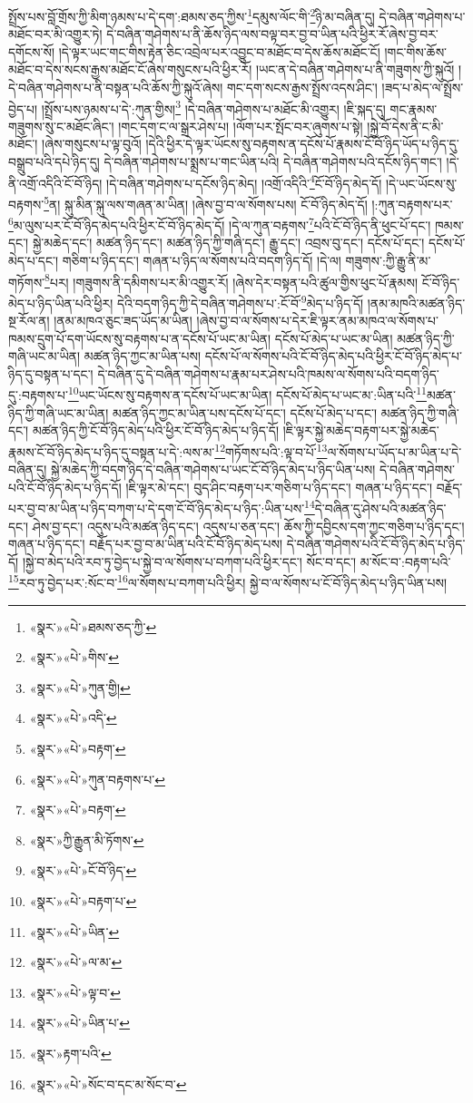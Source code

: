 སྤྲོས་པས་བློ་གྲོས་ཀྱི་མིག་ཉམས་པ་དེ་དག་:ཐམས་ཅད་ཀྱིས་\footnote{«སྣར་»«པེ་»ཐམས་ཅད་ཀྱི་}དམུས་ལོང་གི་\footnote{«སྣར་»«པེ་»གིས་}ཉི་མ་བཞིན་དུ། དེ་བཞིན་གཤེགས་པ་མཐོང་བར་མི་འགྱུར་ཏེ། དེ་བཞིན་གཤེགས་པ་ནི་ཆོས་ཉིད་ལས་བལྟ་བར་བྱ་བ་ཡིན་པའི་ཕྱིར་རོ་ཞེས་བྱ་བར་དགོངས་སོ། །དེ་ལྟར་ཡང་གང་གིས་རྟེན་ཅིང་འབྲེལ་པར་འབྱུང་བ་མཐོང་བ་དེས་ཆོས་མཐོང་ངོ། །གང་གིས་ཆོས་མཐོང་བ་དེས་སངས་རྒྱས་མཐོང་ངོ་ཞེས་གསུངས་པའི་ཕྱིར་རོ། །ཡང་ན་དེ་བཞིན་གཤེགས་པ་ནི་གཟུགས་ཀྱི་སྐུའོ། །དེ་བཞིན་གཤེགས་པ་ནི་བསྟན་པའི་ཆོས་ཀྱི་སྐུའོ་ཞེས། གང་དག་སངས་རྒྱས་སྤྲོས་འདས་ཤིང་། །ཟད་པ་མེད་ལ་སྤྲོས་བྱེད་པ། །སྤྲོས་པས་ཉམས་པ་དེ་:ཀུན་གྱིས།\footnote{«སྣར་»«པེ་»ཀུན་གྱི།} །དེ་བཞིན་གཤེགས་པ་མཐོང་མི་འགྱུར། །ཇི་སྐད་དུ། གང་རྣམས་གཟུགས་སུ་ང་མཐོང་ཞིང་། །གང་དག་ང་ལ་སྒྲར་ཤེས་པ། །ལོག་པར་སྤོང་བར་ཞུགས་པ་སྟེ། །སྐྱེ་བོ་དེས་ནི་ང་མི་མཐོང་། །ཞེས་གསུངས་པ་ལྟ་བུའོ། །དེའི་ཕྱིར་དེ་ལྟར་ཡོངས་སུ་བརྟགས་ན་དངོས་པོ་རྣམས་ངོ་བོ་ཉིད་ཡོད་པ་ཉིད་དུ་བསྒྲུབ་པའི་དཔེ་ཉིད་དུ། དེ་བཞིན་གཤེགས་པ་སྨྲས་པ་གང་ཡིན་པའི། དེ་བཞིན་གཤེགས་པའི་དངོས་ཉིད་གང་། །དེ་ནི་འགྲོ་འདིའི་ངོ་བོ་ཉིད། །དེ་བཞིན་གཤེགས་པ་དངོས་ཉིད་མེད། །འགྲོ་འདིའི་\footnote{«སྣར་»«པེ་»འདི་}ངོ་བོ་ཉིད་མེད་དོ། །དེ་ཡང་ཡོངས་སུ་བརྟགས་\footnote{«སྣར་»«པེ་»བརྟག་}ན། སྐུ་མིན་སྐུ་ལས་གཞན་མ་ཡིན། །ཞེས་བྱ་བ་ལ་སོགས་པས། ངོ་བོ་ཉིད་མེད་དོ། །:ཀུན་བརྟགས་པར་\footnote{«སྣར་»«པེ་»ཀུན་བརྟགས་པ་}མ་ལུས་པར་ངོ་བོ་ཉིད་མེད་པའི་ཕྱིར་ངོ་བོ་ཉིད་མེད་དོ། །དེ་ལ་ཀུན་བརྟགས་\footnote{«སྣར་»«པེ་»བརྟག་}པའི་ངོ་བོ་ཉིད་ནི་ཕུང་པོ་དང་། ཁམས་དང་། སྐྱེ་མཆེད་དང་། མཚན་ཉིད་དང་། མཚན་ཉིད་ཀྱི་གཞི་དང་། རྒྱུ་དང་། འབྲས་བུ་དང་། དངོས་པོ་དང་། དངོས་པོ་མེད་པ་དང་། གཅིག་པ་ཉིད་དང་། གཞན་པ་ཉིད་ལ་སོགས་པའི་བདག་ཉིད་དོ། །དེ་ལ། གཟུགས་:ཀྱི་རྒྱུ་ནི་མ་གཏོགས་\footnote{«སྣར་»ཀྱི་རྒྱུན་མི་ཏོགས་}པར། །གཟུགས་ནི་དམིགས་པར་མི་འགྱུར་རོ། །ཞེས་དེར་བསྟན་པའི་ཚུལ་གྱིས་ཕུང་པོ་རྣམས། ངོ་བོ་ཉིད་མེད་པ་ཉིད་ཡིན་པའི་ཕྱིར། དེའི་བདག་ཉིད་ཀྱི་དེ་བཞིན་གཤེགས་པ་:ངོ་བོ་\footnote{«སྣར་»«པེ་»ངོ་བོ་ཉིད་}མེད་པ་ཉིད་དོ། །ནམ་མཁའི་མཚན་ཉིད་སྔ་རོལ་ན། །ནམ་མཁའ་ཅུང་ཟད་ཡོད་མ་ཡིན། །ཞེས་བྱ་བ་ལ་སོགས་པ་དེར་ཇི་ལྟར་ནམ་མཁའ་ལ་སོགས་པ་ཁམས་དྲུག་པོ་དག་ཡོངས་སུ་བརྟགས་པ་ན་དངོས་པོ་ཡང་མ་ཡིན། དངོས་པོ་མེད་པ་ཡང་མ་ཡིན། མཚན་ཉིད་ཀྱི་གཞི་ཡང་མ་ཡིན། མཚན་ཉིད་ཀྱང་མ་ཡིན་པས། དངོས་པོ་ལ་སོགས་པའི་ངོ་བོ་ཉིད་མེད་པའི་ཕྱིར་ངོ་བོ་ཉིད་མེད་པ་ཉིད་དུ་བསྟན་པ་དང་། དེ་བཞིན་དུ་དེ་བཞིན་གཤེགས་པ་རྣམ་པར་ཤེས་པའི་ཁམས་ལ་སོགས་པའི་བདག་ཉིད་དུ་:བརྟགས་པ་\footnote{«སྣར་»«པེ་»བརྟག་པ་}ཡང་ཡོངས་སུ་བརྟགས་ན་དངོས་པོ་ཡང་མ་ཡིན། དངོས་པོ་མེད་པ་ཡང་མ་:ཡིན་པའི་\footnote{«སྣར་»«པེ་»ཡིན་}མཚན་ཉིད་ཀྱི་གཞི་ཡང་མ་ཡིན། མཚན་ཉིད་ཀྱང་མ་ཡིན་པས་དངོས་པོ་དང་། དངོས་པོ་མེད་པ་དང་། མཚན་ཉིད་ཀྱི་གཞི་དང་། མཚན་ཉིད་ཀྱི་ངོ་བོ་ཉིད་མེད་པའི་ཕྱིར་ངོ་བོ་ཉིད་མེད་པ་ཉིད་དོ། །ཇི་ལྟར་སྐྱེ་མཆེད་བརྟག་པར་སྐྱེ་མཆེད་རྣམས་ངོ་བོ་ཉིད་མེད་པ་ཉིད་དུ་བསྟན་པ་དེ་:ལས་མ་\footnote{«སྣར་»«པེ་»ལ་མ་}གཏོགས་པའི་:ལྟ་བ་པོ་\footnote{«སྣར་»«པེ་»ལྟ་བ་}ལ་སོགས་པ་ཡོད་པ་མ་ཡིན་པ་དེ་བཞིན་དུ། སྐྱེ་མཆེད་ཀྱི་བདག་ཉིད་དེ་བཞིན་གཤེགས་པ་ཡང་ངོ་བོ་ཉིད་མེད་པ་ཉིད་ཡིན་པས། དེ་བཞིན་གཤེགས་པའི་ངོ་བོ་ཉིད་མེད་པ་ཉིད་དོ། །ཇི་ལྟར་མེ་དང་། བུད་ཤིང་བརྟག་པར་གཅིག་པ་ཉིད་དང་། གཞན་པ་ཉིད་དང་། བརྗོད་པར་བྱ་བ་མ་ཡིན་པ་ཉིད་བཀག་པ་དེ་དག་ངོ་བོ་ཉིད་མེད་པ་ཉིད་:ཡིན་པས་\footnote{«སྣར་»«པེ་»ཡིན་པ་}དེ་བཞིན་དུ་ཤེས་པའི་མཚན་ཉིད་དང་། ཤེས་བྱ་དང་། འདུས་པའི་མཚན་ཉིད་དང་། འདུས་པ་ཅན་དང་། ཆོས་ཀྱི་དབྱིངས་དག་ཀྱང་གཅིག་པ་ཉིད་དང་། གཞན་པ་ཉིད་དང་། བརྗོད་པར་བྱ་བ་མ་ཡིན་པའི་ངོ་བོ་ཉིད་མེད་པས། དེ་བཞིན་གཤེགས་པའི་ངོ་བོ་ཉིད་མེད་པ་ཉིད་དོ། །སྐྱེ་བ་མེད་པའི་རབ་ཏུ་བྱེད་པ་སྐྱེ་བ་ལ་སོགས་པ་བཀག་པའི་ཕྱིར་དང་། སོང་བ་དང་། མ་སོང་བ་:བརྟག་པའི་\footnote{«སྣར་»རྟག་པའི་}རབ་ཏུ་བྱེད་པར་:སོང་བ་\footnote{«སྣར་»«པེ་»སོང་བ་དང་མ་སོང་བ་}ལ་སོགས་པ་བཀག་པའི་ཕྱིར། སྐྱེ་བ་ལ་སོགས་པ་ངོ་བོ་ཉིད་མེད་པ་ཉིད་ཡིན་པས། 